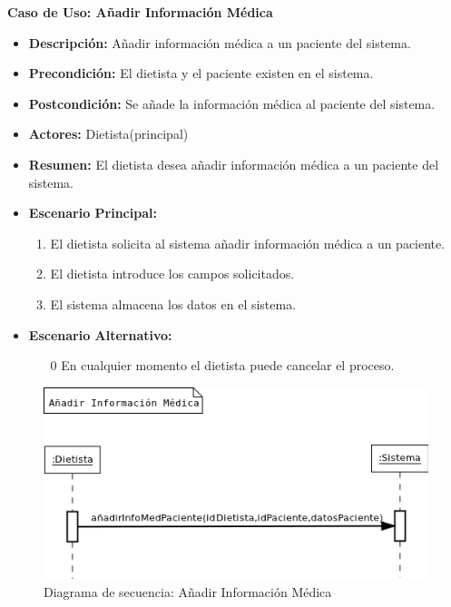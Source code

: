 \textbf{Caso de Uso: Añadir Información Médica}
\begin{itemize}
\item \textbf{Descripción:} Añadir información médica a un paciente del sistema.
\item \textbf{Precondición:} El dietista y el paciente existen en el sistema.
\item \textbf{Postcondición:} Se añade la información médica al paciente del sistema.
\item \textbf{Actores:} Dietista(principal)
\item \textbf{Resumen:} El dietista desea añadir información médica a un paciente del sistema.
\item \textbf{Escenario Principal:}
\begin{enumerate}
\item El dietista solicita al sistema añadir información médica a un paciente.
\item El dietista introduce los campos solicitados.
\item El sistema almacena los datos en el sistema.
\end{enumerate}
\item \textbf{Escenario Alternativo:}
\begin{enumerate}
\item[0] En cualquier momento el dietista puede cancelar el proceso.
\end{enumerate}
\end{itemize}
\begin{figure}[H]
  \label{ds_anadirinfomed}
  \begin{center}
    \includegraphics[scale=0.7]{../img/DS_AnadirInfoMed.png}
  \end{center}
  \caption{Diagrama de secuencia: Añadir Información Médica}
\end{figure}
